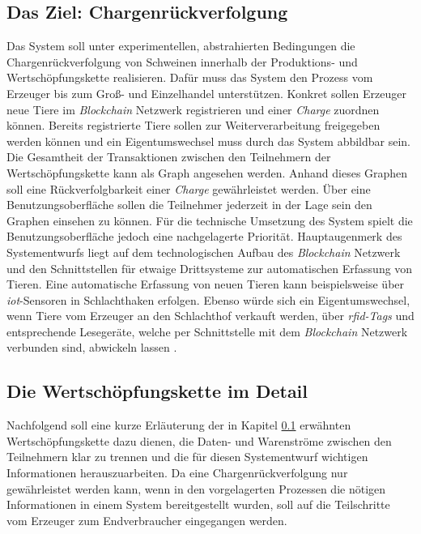 \subsection{Das Ziel: Chargenrückverfolgung} \label{goal-description}
Das System soll unter experimentellen, abstrahierten Bedingungen die Chargenrückverfolgung von Schweinen innerhalb der Produktions- und Wertschöpfungskette realisieren. Dafür muss das System den Prozess vom Erzeuger bis zum Groß- und Einzelhandel unterstützen. Konkret sollen Erzeuger neue Tiere im \textit{Blockchain} Netzwerk registrieren und einer \textit{Charge} zuordnen können. Bereits registrierte Tiere sollen zur Weiterverarbeitung freigegeben werden können und ein Eigentumswechsel muss durch das System abbildbar sein. Die Gesamtheit der Transaktionen zwischen den Teilnehmern der Wertschöpfungskette kann als Graph angesehen werden. Anhand dieses Graphen soll eine Rückverfolgbarkeit einer \textit{Charge} gewährleistet werden. Über eine Benutzungsoberfläche sollen die Teilnehmer jederzeit in der Lage sein den Graphen einsehen zu können. Für die technische Umsetzung des System spielt die Benutzungsoberfläche jedoch eine nachgelagerte Priorität. Hauptaugenmerk des Systementwurfs liegt auf dem technologischen Aufbau des \textit{Blockchain} Netzwerk und den Schnittstellen für etwaige Drittsysteme zur automatischen Erfassung von Tieren. Eine automatische Erfassung von neuen Tieren kann beispielsweise über \textit{\ac{iot}}-Sensoren in Schlachthaken erfolgen. Ebenso würde sich ein Eigentumswechsel, wenn Tiere vom Erzeuger an den Schlachthof verkauft werden, über \textit{\acs{rfid}-Tags} und entsprechende Lesegeräte, welche per Schnittstelle mit dem \textit{Blockchain} Netzwerk verbunden sind, abwickeln lassen \citep{Dorri2017, Samaniego2016}.

\subsection{Die Wertschöpfungskette im Detail}
Nachfolgend soll eine kurze Erläuterung der in Kapitel \ref{goal-description} erwähnten Wertschöpfungskette dazu dienen, die Daten- und Warenströme zwischen den Teilnehmern klar zu trennen und die für diesen Systementwurf wichtigen Informationen herauszuarbeiten. Da eine Chargenrückverfolgung nur gewährleistet werden kann, wenn in den vorgelagerten Prozessen die nötigen Informationen in einem System bereitgestellt wurden, soll auf die Teilschritte vom Erzeuger zum Endverbraucher eingegangen werden.

